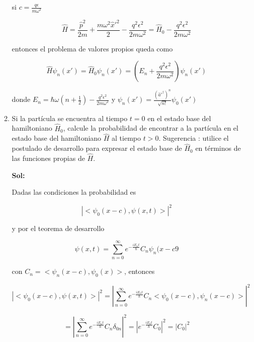 \documentclass[12pt,a4paper]{article}
\begin{document}
\begin{enumerate}
\begin{enumerate}
    si $c= \frac{q \epsilon}{m \omega^2}$
    
    \begin{equation*}
        \hat{H} = \frac{\hat{p}^2}{2m}+\frac{m \omega^2 \hat{x}'^2}{2} - \frac{q^2 \epsilon^2}{2m \omega^2} = \hat{H}_0 -\frac{q^2 \epsilon^2}{2m \omega^2}
    \end{equation*}
    
    entonces el problema de valores propios queda como
    
    \begin{equation*}
        \hat{H} \psi_{n} (x') =\hat{H}_0 \psi_{n}(x') = (E_n + \frac{q^2 \epsilon^2}{2m \omega^2}) \psi_{n} (x') 
    \end{equation*}
    
    donde $E_n = \hbar \omega (n + \frac{1}{2}) - \frac{q^2 \epsilon^2}{2m \omega^2}$ y $\psi_{n}(x') = \frac{(\hat{a}'^{\dagger})^n}{\sqrt{n!}} \psi_0 (x')$
    
    
    \item Si la partícula se encuentra al tiempo $t=0$ en el estado base del hamiltoniano $\hat{H}_0$, calcule la probabilidad de encontrar a la partícula en el estado base del hamiltoniano $\hat{H}$ al tiempo $t>0$. Sugerencia : utilice el postulado de desarrollo para expresar el estado base de $\hat{H}_0$ en términos de las funciones propias de $\hat{H}$.
    
    \textbf{Sol:}
    
    Dadas las condiciones la probabilidad es
    
    \begin{equation*}
        |<\psi_{0}(x-c),\psi(x,t)>|^2
    \end{equation*}
    
    y por el teorema de desarrollo
    
    \begin{equation*}
        \psi(x,t) = \sum_{n=0}^{\infty} e^{-\frac{i E_n t}{\hbar}} C_n \psi_{n} (x-c9
    \end{equation*}
    
    con $C_n = <\psi_{n}(x-c), \psi_{0} (x)>$, entonces
    
    \begin{equation*}
        |<\psi_{0}(x-c),\psi(x,t)>|^2 = \left|\sum_{n=0}^{\infty} e^{- \frac{iE_nt}{\hbar}}C_n<\psi_{0}(x-c), \psi_{n}(x-c)>\right|^2
    \end{equation*}
    
    \begin{equation*}
        = \left| \sum_{n=0}^{\infty} e^{- \frac{iE_nt}{\hbar}}C_n \delta_{0n} \right|^2 = \left|  e^{- \frac{iE_0t}{\hbar}}C_0 \right|^2= |C_0|^2
    \end{equation*}
    

\end{enumerate}
\end{enumerate}
\end{document}
